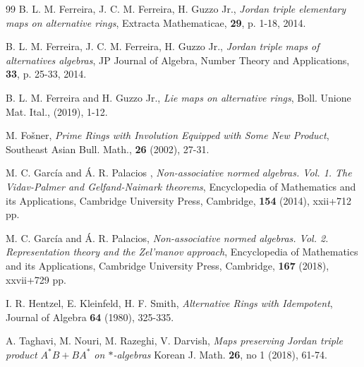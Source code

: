 \documentclass{amsart}
\begin{document}
\begin{thebibliography}{99}
B. L. M. Ferreira, J. C. M.  Ferreira, H. Guzzo Jr., 
{\em Jordan triple elementary maps on alternative rings}, 
Extracta Mathematicae, \textbf{29}, p. 1-18, 2014.

B. L. M. Ferreira, J. C. M.  Ferreira, H. Guzzo Jr., 
{\em Jordan triple maps of alternatives algebras}, 
JP Journal of Algebra, Number Theory and Applications, \textbf{33}, p. 25-33, 2014.

B. L. M. Ferreira and H. Guzzo Jr., 
{\em Lie maps on alternative rings}, 
Boll. Unione Mat. Ital., (2019), 1-12.

M. Fo\v sner, 
{\em Prime Rings with Involution Equipped with Some New Product}, 
Southeast Asian Bull. Math., \textbf{26} (2002), 27-31.

    M. C. Garc\'ia and \'A. R. Palacios , 
    {\em Non-associative normed algebras. Vol. 1. The Vidav-Palmer and Gelfand-Naimark theorems}, Encyclopedia of Mathematics and its Applications, Cambridge University Press, Cambridge, \textbf{154} (2014), xxii+712 pp.


  M. C. Garc\'ia and \'A. R. Palacios, 
    {\em Non-associative normed algebras. Vol. 2. Representation theory and the Zel'manov approach}, Encyclopedia of Mathematics and its Applications, Cambridge University Press, Cambridge, \textbf{167} (2018), xxvii+729 pp.
    
  I. R. Hentzel, E. Kleinfeld, H. F. Smith, 
{\it Alternative Rings with Idempotent}, 
Journal of Algebra \textbf{64} (1980), 325-335.







A. Taghavi, M. Nouri, M. Razeghi, V. Darvish, 
{\it Maps preserving Jordan triple product $A^*B+BA^*$ on $*$-algebras}
Korean J. Math.  \textbf{26}, no 1 (2018), 61-74.













\end{thebibliography}
\end{document}
